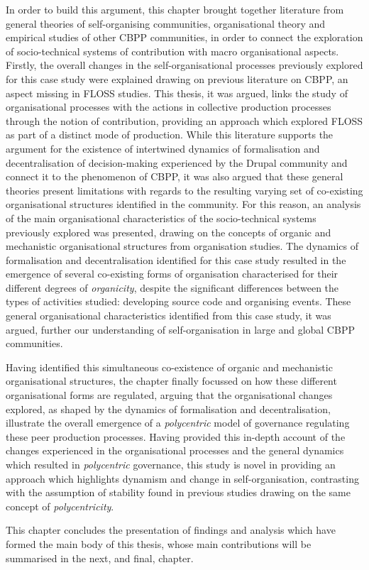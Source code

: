 In order to build this argument, this chapter brought together literature from general theories of self-organising communities, organisational theory and empirical studies of other CBPP communities, in order to  connect the exploration of socio-technical systems of contribution with macro organisational aspects. Firstly, the overall changes in the self-organisational processes previously explored for this case study were explained drawing on previous literature on CBPP, an aspect missing in FLOSS studies. This thesis, it was argued, links the study of organisational processes with the actions in collective production processes through the notion of contribution, providing an approach which explored FLOSS as part of a distinct mode of production. While this literature supports the argument for the existence of intertwined dynamics of formalisation and decentralisation of decision-making experienced by the Drupal community and connect it to the phenomenon of CBPP, it was also argued that these general theories present limitations with regards to the resulting varying set of co-existing organisational structures identified in the community. For this reason, an analysis of the main organisational characteristics of the socio-technical systems previously explored was presented, drawing on the concepts of organic and mechanistic organisational structures from organisation studies. The dynamics of formalisation and decentralisation identified for this case study resulted in the emergence of several co-existing forms of organisation characterised for their different degrees of \textit{organicity}, despite the significant differences between the types of activities studied: developing source code and organising events. These general organisational characteristics identified from this case study, it was argued, further our understanding of self-organisation in large and global CBPP communities.

Having identified this simultaneous co-existence of organic and mechanistic organisational structures, the chapter finally focussed on how these different organisational forms are regulated, arguing that the organisational changes explored, as shaped by the dynamics of formalisation and decentralisation, illustrate the overall emergence of a \textit{polycentric} model of governance regulating these peer production processes. Having provided this in-depth account of the changes experienced in the organisational processes and the general dynamics which resulted in \textit{polycentric} governance, this study is novel in providing an approach which highlights dynamism and change in self-organisation, contrasting with the assumption of stability found in previous studies drawing on the same concept of \textit{polycentricity}.

This chapter concludes the presentation of findings and analysis which have formed the main body of this thesis, whose main contributions will be summarised in the next, and final, chapter.